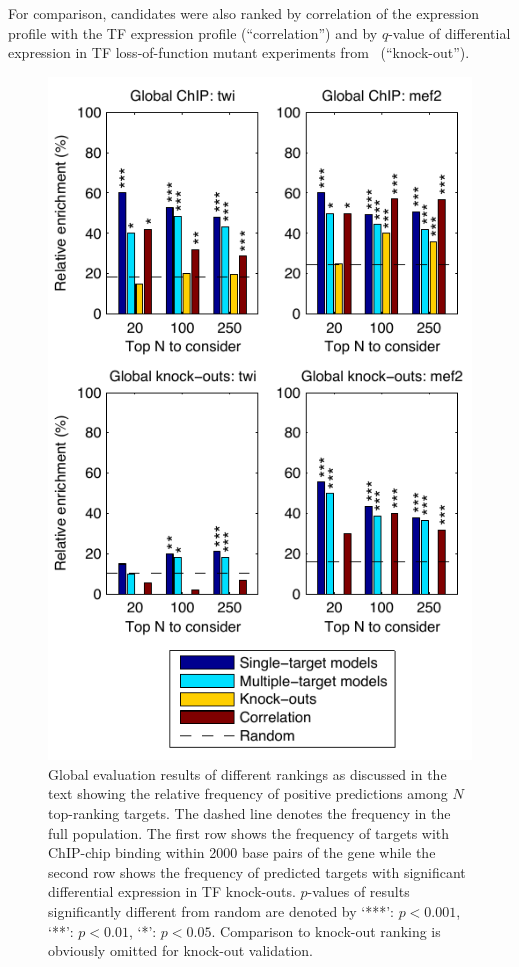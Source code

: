 \documentclass{pnastwo}
\begin{document}
\begin{article}
For comparison, candidates were also ranked by correlation of the
expression profile with the TF expression profile (``correlation'')
and by $q$-value of differential expression in TF loss-of-function mutant
experiments from~\cite{Sandmann2006a,Sandmann2007} (``knock-out''). 

\begin{figure}[tb]
  \centering
  \includegraphics{dros_global_evaluation}
  \caption{Global evaluation results of different rankings as
    discussed in the text showing the relative frequency of positive
    predictions among $N$ top-ranking targets.
    The dashed line
    denotes the frequency in the full population.
    The first row shows the frequency of targets with ChIP-chip
    binding within 2000 base pairs of the gene
    while the second row shows the frequency of
    predicted targets with significant differential
    expression in TF knock-outs.
    $p$-values of results significantly different from random are
    denoted by `***': $p <
    0.001$, `**': $p < 0.01$, `*': $p < 0.05$.
    Comparison to knock-out ranking is obviously omitted for knock-out
    validation. \label{fig:dros_global_evaluation}
  }
\end{figure}


\end{article}
\end{document}
